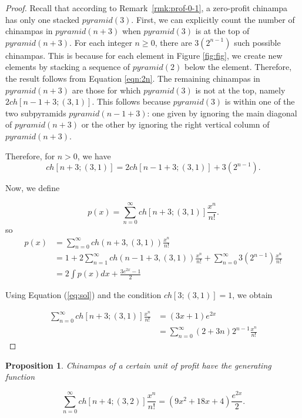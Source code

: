 \documentclass[a4paper]{article}\usepackage[english]{babel}
\newtheorem{proposition}[theorem]{Proposition}
\theoremstyle{definition}
\newcommand{\apyr}[1][l]{\ensuremath{pyramid(#1)}}
\newcommand{\chin}[2][n]{\ensuremath{ch[#1;#2]}}
\begin{document}
\begin{proof}
Recall that according to Remark~\ref{rmk:prof-0-1}, a zero-profit chinampa has only one stacked $\apyr[3]$. First, we can explicitly count the number of chinampas in $\apyr[n+3]$ when $\apyr[3]$ is at the top of $\apyr[n+3]$. For each integer $n \ge 0$, there are $3(2^{n-1})$ such possible chinampas. This is because for each element in Figure \ref{fig:fig}, we create new elements by stacking a sequence of $\apyr[2]$ below the element. Therefore, the result follows from Equation \eqref{eqn:2n}. The remaining chinampas in $\apyr[n+3]$ are those for which $\apyr[3]$ is not at the top, namely $2\chin[n-1+3]{(3, 1)}$. This follows because $\apyr[3]$ is within one of the two subpyramids $pyramid(n-1+3)$: one given by ignoring the main diagonal of $pyramid(n+3)$ or the other by ignoring the right vertical column of $pyramid(n+3)$.

Therefore, for $n>0$, we have
\begin{equation*}
\chin[n+3]{(3,1)} = 2\chin[n-1+3]{(3, 1)}+3(2^{n-1}).   
\end{equation*}

Now, we define 

\begin{equation*}
p(x) = \sum_{n= 0}^{\infty} \chin[n+3]{(3,1)}\frac{x^n}{n!}.
\end{equation*}
so
\begin{align*}
p(x) &= \sum_{n=0}^{\infty} ch(n+3,(3,1))\frac{x^n}{n!}\\ 
&=1+ 2\sum_{n=1}^{\infty} ch(n-1+3, (3, 1))\frac{x^n}{n!}+\sum_{n=0}^{\infty} 3(2^{n-1})\frac{x^n}{n!}\\
&=2\int{p(x) dx} + \frac{3e^{2x}-1}{2}
\end{align*}

Using Equation (\ref{eq:sol}) and the condition $\chin[3]{(3,1)}=1$,  we obtain

\begin{align*}
\sum_{n=0}^{\infty} \chin[n+3]{(3,1)}\frac{x^n}{n!}
&=(3x+1)e^{2x}\\
&=\sum_{n=0}^{\infty} (2+3n) 2^{n-1}\frac{x^n}{n!}
\end{align*}
\end{proof}

\begin{proposition}\label{lemma:one}
Chinampas of a certain unit of profit have the generating function

\begin{equation*}
\sum_{n=0}^{\infty} \chin[n+4]{ (3,2)}\frac{x^n}{n!}=(9x^2+18x+4)\frac{e^{2x}}{2}.
\end{equation*}
\end{proposition}
\end{document}
